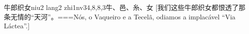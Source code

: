 \begin{EntryWithPhonetic}{牛郎织女}{niu2 lang2 zhi1nv3}{4,8,8,3}{⽜、⾢、⽷、⼥}
  [我们这些牛郎织女都恨透了那条无情的“天河”。===Nós, o Vaqueiro e a Tecelã, odiamos a implacável ``Via Láctea''.]
\end{EntryWithPhonetic}
